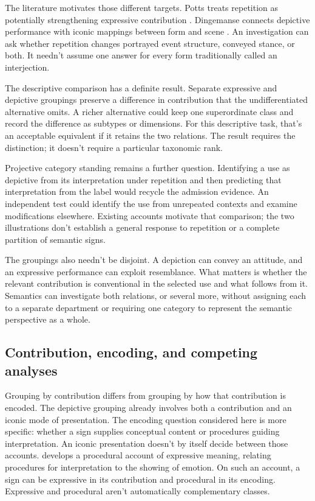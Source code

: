 \documentclass[12pt]{article}
\begin{document}
The literature motivates those different targets. Potts treats repetition
as potentially strengthening expressive contribution \citep[181--182]{potts2007}.
Dingemanse connects depictive performance with iconic mappings between
form and scene \citep[10--11]{dingemanse2018}. An investigation can
ask whether repetition changes portrayed event structure, conveyed stance,
or both. It needn't assume one answer for every form traditionally
called an interjection.

The descriptive comparison has a definite result. Separate expressive
and depictive groupings preserve a difference in contribution that the
undifferentiated alternative omits. A richer alternative could keep one
superordinate class and record the difference as subtypes or dimensions.
For this descriptive task, that's an acceptable equivalent if it retains
the two relations. The result requires the distinction; it doesn't require
a particular taxonomic rank.

Projective category standing remains a further question. Identifying a use
as depictive from its interpretation under repetition and then predicting
that interpretation from the label would recycle the admission evidence.
An independent test could identify the use from unrepeated contexts and
examine modifications elsewhere. Existing accounts motivate that comparison;
the two illustrations don't establish a general response to repetition or
a complete partition of semantic signs.

The groupings also needn't be disjoint. A depiction can convey an attitude,
and an expressive performance can exploit resemblance. What matters is
whether the relevant contribution is conventional in the selected use and
what follows from it. Semantics can investigate both relations, or several
more, without assigning each to a separate department or requiring one
category to represent the semantic perspective as a whole.

\subsection{Contribution, encoding, and competing analyses}

Grouping by contribution differs from grouping by how that contribution
is encoded. The depictive grouping already involves both a contribution
and an iconic mode of presentation. The encoding question considered
here is more specific: whether a sign supplies conceptual content or
procedures guiding interpretation. An iconic presentation doesn't by
itself decide between those accounts. \textcite{wharton2016expressives} develops a procedural account
of expressive meaning, relating procedures for interpretation to the
showing of emotion. On such an account, a sign can be expressive in its
contribution and procedural in its encoding. Expressive and procedural
aren't automatically complementary classes.
\end{document}
